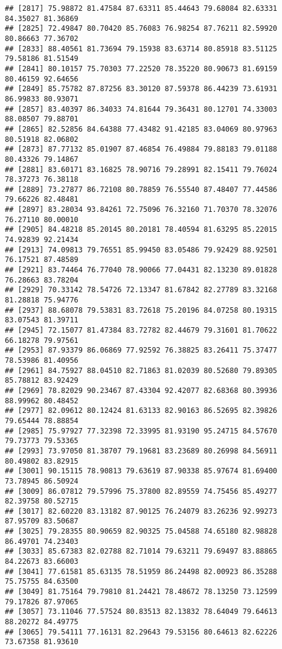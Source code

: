 \documentclass[
]{article}
\begin{document}
\begin{verbatim}
## [2817] 75.98872 81.47584 87.63311 85.44643 79.68084 82.63331 84.35027 81.36869
## [2825] 72.49847 80.70420 85.76083 76.98254 87.76211 82.59920 80.86663 77.36702
## [2833] 88.40561 81.73694 79.15938 83.63714 80.85918 83.51125 79.58186 81.51549
## [2841] 80.10157 75.70303 77.22520 78.35220 80.90673 81.69159 80.46159 92.64656
## [2849] 85.75782 87.87256 83.30120 87.59378 86.44239 73.61931 86.99833 80.93071
## [2857] 83.40397 86.34033 74.81644 79.36431 80.12701 74.33003 88.08507 79.88701
## [2865] 82.52856 84.64388 77.43482 91.42185 83.04069 80.97963 80.51918 82.06802
## [2873] 87.77132 85.01907 87.46854 76.49884 79.88183 79.01188 80.43326 79.14867
## [2881] 83.60171 83.16825 78.90716 79.28991 82.15411 79.76024 78.37273 76.38118
## [2889] 73.27877 86.72108 80.78859 76.55540 87.48407 77.44586 79.66226 82.48481
## [2897] 83.28034 93.84261 72.75096 76.32160 71.70370 78.32076 76.27110 80.00010
## [2905] 84.48218 85.20145 80.20181 78.40594 81.63295 85.22015 74.92839 92.21434
## [2913] 74.09813 79.76551 85.99450 83.05486 79.92429 88.92501 76.17521 87.48589
## [2921] 83.74464 76.77040 78.90066 77.04431 82.13230 89.01828 76.28663 83.78204
## [2929] 70.33142 78.54726 72.13347 81.67842 82.27789 83.32168 81.28818 75.94776
## [2937] 88.68078 79.53831 83.72618 75.20196 84.07258 80.19315 83.07543 81.39711
## [2945] 72.15077 81.47384 83.72782 82.44679 79.31601 81.70622 66.18278 79.97561
## [2953] 87.93379 86.06869 77.92592 76.38825 83.26411 75.37477 78.53986 81.40956
## [2961] 84.75927 88.04510 82.71863 81.02039 80.52680 79.89305 85.78812 83.92429
## [2969] 78.82029 90.23467 87.43304 92.42077 82.68368 80.39936 88.99962 80.48452
## [2977] 82.09612 80.12424 81.63133 82.90163 86.52695 82.39826 79.65444 78.88854
## [2985] 75.97927 77.32398 72.33995 81.93190 95.24715 84.57670 79.73773 79.53365
## [2993] 73.97050 81.38707 79.19681 83.23689 80.26998 84.56911 80.49802 83.82915
## [3001] 90.15115 78.90813 79.63619 87.90338 85.97674 81.69400 73.78945 86.50924
## [3009] 86.07812 79.57996 75.37800 82.89559 74.75456 85.49277 82.39758 80.52715
## [3017] 82.60220 83.13182 87.90125 76.24079 83.26236 92.99273 87.95709 83.50687
## [3025] 79.28355 80.90659 82.90325 75.04588 74.65180 82.98828 86.49701 74.23403
## [3033] 85.67383 82.02788 82.71014 79.63211 79.69497 83.88865 84.22673 83.66003
## [3041] 77.61581 85.63135 78.51959 86.24498 82.00923 86.35288 75.75755 84.63500
## [3049] 81.75164 79.79810 81.24421 78.48672 78.13250 73.12599 79.17826 87.97065
## [3057] 73.11046 77.57524 80.83513 82.13832 78.64049 79.64613 88.20272 84.49775
## [3065] 79.54111 77.16131 82.29643 79.53156 80.64613 82.62226 73.67358 81.93610

\end{verbatim}
\end{document}
